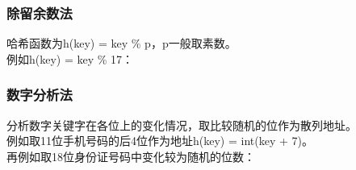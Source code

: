 \subsubsection{除留余数法}

哈希函数为h(key) = key \% p，p一般取素数。\\

例如h(key) = key \% 17：

\begin{table}[H]
	\centering
	\caption{除留余数法}
\end{table}

\subsubsection{数字分析法}

分析数字关键字在各位上的变化情况，取比较随机的位作为散列地址。\\

例如取11位手机号码的后4位作为地址h(key) = int(key + 7)。\\

再例如取18位身份证号码中变化较为随机的位数：

